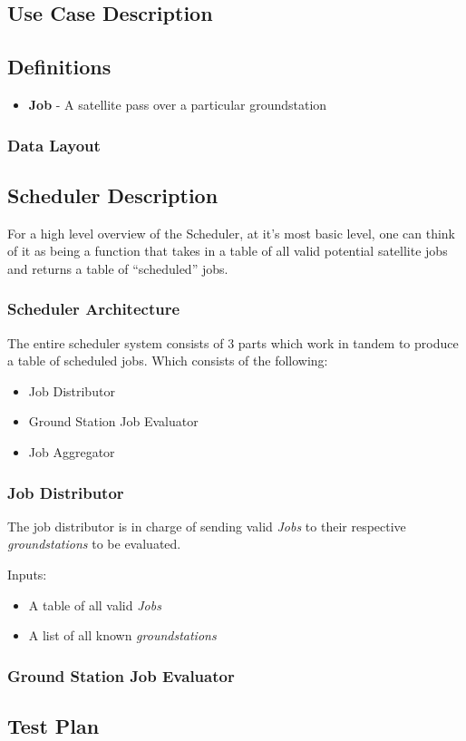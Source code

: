 \documentclass{article}
\begin{document}
\subsection{Use Case Description}

\subsection{Definitions}

\begin{itemize}
  \item \textbf{Job} - A satellite pass over a particular groundstation
\end{itemize}

\subsubsection{Data Layout}


\subsection{Scheduler Description}

For a high level overview of the Scheduler, at it's most basic level, one can
think of it as being a function that takes in a table of all valid potential
satellite jobs and returns a table of ``scheduled'' jobs.

\subsubsection{Scheduler Architecture}

The entire scheduler system consists of 3 parts which work in tandem to produce
a table of scheduled jobs. Which consists of the following:

\begin{itemize}
\item Job Distributor
\item Ground Station Job Evaluator
\item Job Aggregator
\end{itemize}

\subsubsection{Job Distributor}

The job distributor is in charge of sending valid \textit{Jobs} to their
respective \textit{groundstations} to be evaluated.

\noindent
Inputs:

\begin{itemize}
  \item A table of all valid \textit{Jobs}
  \item A list of all known \textit{groundstations}
\end{itemize}


\subsubsection{Ground Station Job Evaluator}



\subsection{Test Plan}
\end{document}
